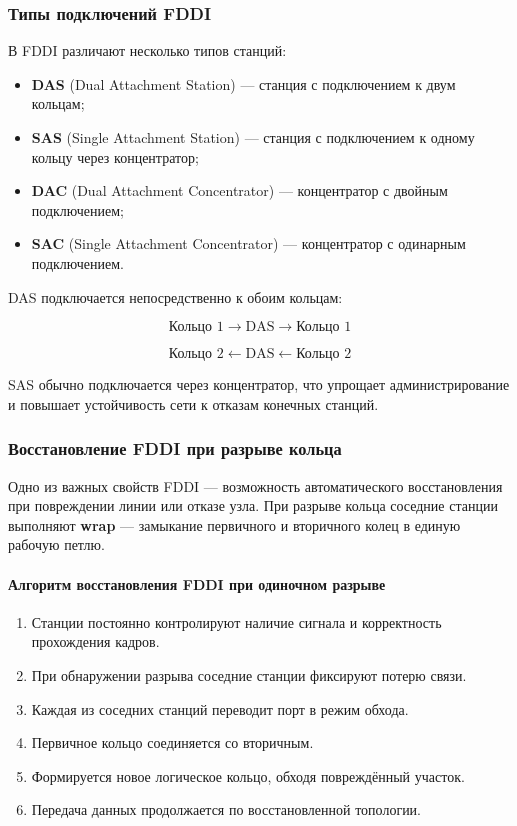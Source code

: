 \documentclass[12pt,a4paper]{article}
\begin{document}
\subsubsection{Типы подключений FDDI}

В FDDI различают несколько типов станций:
\begin{itemize}
    \item \textbf{DAS} (Dual Attachment Station) --- станция с подключением к двум кольцам;
    \item \textbf{SAS} (Single Attachment Station) --- станция с подключением к одному кольцу через концентратор;
    \item \textbf{DAC} (Dual Attachment Concentrator) --- концентратор с двойным подключением;
    \item \textbf{SAC} (Single Attachment Concentrator) --- концентратор с одинарным подключением.
\end{itemize}

DAS подключается непосредственно к обоим кольцам:

\[
\text{Кольцо 1} \longrightarrow \boxed{\text{DAS}} \longrightarrow \text{Кольцо 1}
\]

\[
\text{Кольцо 2} \longleftarrow \boxed{\text{DAS}} \longleftarrow \text{Кольцо 2}
\]

SAS обычно подключается через концентратор, что упрощает администрирование и повышает устойчивость сети к отказам конечных станций.

\subsubsection{Восстановление FDDI при разрыве кольца}

Одно из важных свойств FDDI --- возможность автоматического восстановления при повреждении линии или отказе узла. При разрыве кольца соседние станции выполняют \textbf{wrap} --- замыкание первичного и вторичного колец в единую рабочую петлю.

\paragraph{Алгоритм восстановления FDDI при одиночном разрыве}

\begin{enumerate}
    \item Станции постоянно контролируют наличие сигнала и корректность прохождения кадров.
    \item При обнаружении разрыва соседние станции фиксируют потерю связи.
    \item Каждая из соседних станций переводит порт в режим обхода.
    \item Первичное кольцо соединяется со вторичным.
    \item Формируется новое логическое кольцо, обходя повреждённый участок.
    \item Передача данных продолжается по восстановленной топологии.
\end{enumerate}
\end{document}
